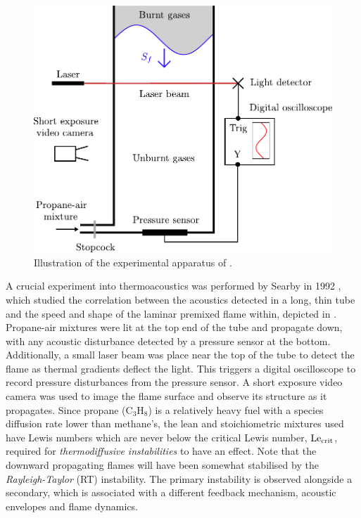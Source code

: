 \begin{figure}[t]
\centering
\includegraphics[scale=0.6]{assets/imgs/Searby-92.pdf}
\caption{Illustration of the experimental apparatus of \cite{searby1992AcousticInstabilityPremixed}.}
\label{fig:searby-experiment}
\end{figure}

A crucial experiment into thermoacoustics was performed by Searby in 1992 \cite{searby1992AcousticInstabilityPremixed}, which studied the correlation between the acoustics detected in a long, thin tube and the speed and shape of the laminar premixed flame within, depicted in . Propane-air mixtures were lit at the top end of the tube and propagate down, with any acoustic disturbance detected by a pressure sensor at the bottom. Additionally, a small laser beam was place near the top of the tube to detect the flame as thermal gradients deflect the light. This triggers a digital oscilloscope to record pressure disturbances from the pressure sensor. A short exposure video camera was used to image the flame surface and observe its structure as it propagates. Since propane (C$_3$H$_8$) is a relatively heavy fuel with a species diffusion rate lower than methane's, the lean and stoichiometric mixtures used have Lewis numbers which are never below the critical Lewis number, $\mathrm{Le}_\mathrm{crit}$, required for \emph{thermodiffusive instabilities} \cite{zeldovich1944TheoryCombustionDetonation,barenblatt1962DiffusionalThermalStabilIty,sivashinsky1977DiffusionalThermalTheoryCellular} to have an effect. Note that the downward propagating flames will have been somewhat stabilised by the \emph{Rayleigh-Taylor} (RT) instability. The primary instability is observed alongside a secondary, which is associated with a different feedback mechanism, acoustic envelopes and flame dynamics.


